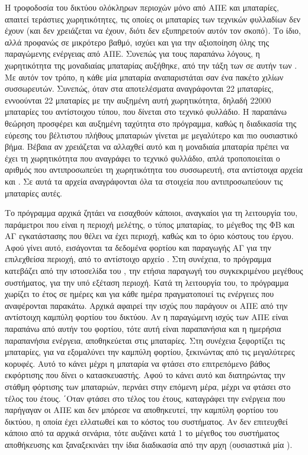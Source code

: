 \documentclass[12pt]{report}
\begin{document}
Η τροφοδοσία του δικτύου ολόκληρων περιοχών μόνο από ΑΠΕ και μπαταρίες, απαιτεί τεράστιες χωρητικότητες, τις οποίες οι μπαταρίες των τεχνικών φυλλαδίων δεν έχουν (και δεν χρειάζεται να
έχουν, διότι δεν εξυπηρετούν αυτόν τον σκοπό). Το ίδιο, αλλά προφανώς σε μικρότερο βαθμό, ισχύει και για την αξιοποίηση όλης της παραγώμενης ενέργειας από ΑΠΕ.
Συνεπώς για τους παραπάνω λόγους, η χωρητικότητα της μοναδιαίας μπαταρίας αυξήθηκε, από την τάξη των {} σε αυτήν των {}. Με αυτόν τον τρόπο, η κάθε μία μπαταρία αναπαριστάται
σαν ένα πακέτο χιλίων συσσωρευτών. Συνεπώς, όταν στα αποτελέσματα αναγράφονται 22 μπαταρίες, εννοούνται 22 μπαταρίες με την αυξημένη αυτή χωρητικότητα, δηλαδή 22000 μπαταρίες του αντίστοιχου τύπου, που δίνεται στο τεχνικό φυλλάδιο.
Η παραπάνω θεώρηση προσφέρει και αυξημένη ταχύτητα στο πρόγραμμα, καθώς η διαδικασία της εύρεσης του βέλτιστου πλήθους μπαταριών γίνεται με μεγαλύτερο και πιο ουσιαστικό βήμα. Βέβαια
αν χρειάζεται να αλλαχθεί αυτό και η μοναδιαία μπαταρία πρέπει να έχει τη χωρητικότητα που αναγράφει το τεχνικό φυλλάδιο, απλά τροποποιείται ο αριθμός που αντιπροσωπεύει τη χωρητικότητα
του συσσωρευτή, στα αντίστοιχα αρχεία {} και {}. Σε αυτά τα αρχεία αναγράφονται όλα τα στοιχεία που αντιπροσωπεύουν τις μπαταρίες αυτές.

Το πρόγραμμα αρχικά ζητάει να εισαχθούν κάποιοι, αναγκαίοι για τη λειτουργία του, παράμετροι που είναι η περιοχή μελέτης, ο τύπος μπαταρίας, το μέγεθος της ΦΒ και ΑΓ εγκατάστασης που θέλει να έχει περιοχή, καθώς και το όριο κόστους 
του έργου.
Αφού γίνει αυτό, εισάγονται τα δεδομένα φορτίου και παραγωγής ΑΓ για την επιλεχθείσα περιοχή, από το αντίστοιχο αρχείο {}. Στη συνέχεια, το πρόγραμμα κατεβάζει από την ιστοσελίδα του {}, την ετήσια
παραγωγή του συγκεκριμένου μεγέθους συστήματος, για την υπό εξέταση περιοχή.
Κατά τη λειτουργία του, το πρόγραμμα χωρίζει το έτος σε ημέρες και για κάθε ημέρα πραγματοποιεί τις ενέργειες που αναφέρονται παρακάτω. Αρχικά αφαιρεί την ισχύς που παράγουν οι ΑΠΕ από την αντίστοιχη καμπύλη φορτίου του δικτύου. 
Αν η παραγώμενη ισχύς των ΑΠΕ είναι παραπάνω από αυτήν του φορτίου, τότε αυτή είναι παραπανήσια και η ημερήσια παραπανήσια ενέργεια, αποθηκεύεται στις μπαταρίες. Στη συνέχεια ξεφορτίζει τις μπαταρίες, για να εξομαλύνει την καμπύλη
φορτίου, ξεκινώντας από τις μεγαλύτερες κορυφές. Αυτό το κάνει μέχρι η μπαταρία να φτάσει στο επιτρεπόμενο βάθος εκφόρτισης που δίνει ο κατασκευαστής. Αφού το κάνει αυτό και διατηρώντας
την στάθμη φόρτισης των μπαταριών, περνάει στην επόμενη μέρα, μέχρι να φτάσει στο τέλος του έτους. ΄Οταν φτάσει στο τέλος του έτους, καταγράφει την ενέργεια που παρήγαγαν οι ΑΠΕ και δεν
μπόρεσε να αποθηκευτεί, την καμπύλη φορτίου του δικτύου, η οποία έχει ελλατωθεί και το κόστος του συστήματος. Αν δεν επιτευχθεί κάποιο από τα αρχικά σενάρια, τότε αυξάνει κατά 1 το μέγεθος
του συστήματος αποθήκευσης και ξαναξεκινάει την ίδια διαδικασία από την αρχη (ουσιαστικά μία {}).
\end{document}
